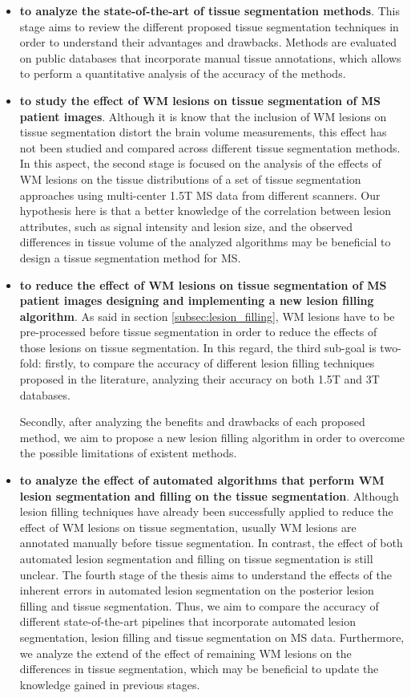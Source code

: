 \begin{itemize}

\item \textbf{to analyze the state-of-the-art of tissue segmentation methods}. This stage aims to review the different proposed tissue segmentation techniques in order to understand their advantages and drawbacks. Methods are evaluated on public databases that incorporate manual tissue annotations, which allows to perform a quantitative analysis of the accuracy of the methods.
  
\item \textbf{to study the effect of WM lesions on tissue segmentation of MS patient images}. Although it is know that the inclusion of WM lesions on tissue segmentation distort the brain volume measurements, this effect has not been studied and compared across different tissue segmentation methods. In this aspect, the second stage is focused on the analysis of the effects of WM lesions on the tissue distributions of a set of tissue segmentation approaches using multi-center 1.5T MS data from different scanners. Our hypothesis here is that a better knowledge of the correlation between lesion attributes, such as signal intensity and lesion size, and the observed differences in tissue volume of the analyzed algorithms may be beneficial to design a tissue segmentation method for MS. 

\item \textbf{to reduce the effect of WM lesions on tissue segmentation of MS patient images designing and implementing a new lesion filling algorithm}. As said in section \ref{subsec:lesion_filling}, WM lesions have to be pre-processed before tissue segmentation in order to reduce the effects of those lesions on tissue segmentation. In this regard, the third sub-goal is two-fold: firstly, to compare the accuracy of different lesion filling techniques proposed in the literature, analyzing their accuracy on both 1.5T and 3T databases. 

Secondly, after analyzing the benefits and drawbacks of each proposed method, we aim to propose a new lesion filling algorithm in order to overcome the possible limitations of existent methods.

\item \textbf{to analyze the effect of automated algorithms that perform WM lesion segmentation and filling on the tissue segmentation}. Although lesion filling techniques have already been successfully applied to reduce the effect of WM lesions on tissue segmentation, usually WM lesions are annotated manually before tissue segmentation. In contrast, the effect of both automated lesion segmentation and filling on tissue segmentation is still unclear. The fourth stage of the thesis aims to understand the effects of the inherent errors in automated lesion segmentation on the posterior lesion filling and tissue segmentation. Thus, we aim to compare the accuracy of different state-of-the-art  pipelines that incorporate automated lesion segmentation, lesion filling and tissue segmentation on MS data. Furthermore, we analyze the extend of the effect of remaining WM lesions on the differences in tissue segmentation, which may be beneficial to update the knowledge gained in previous stages. 


\end{itemize}
